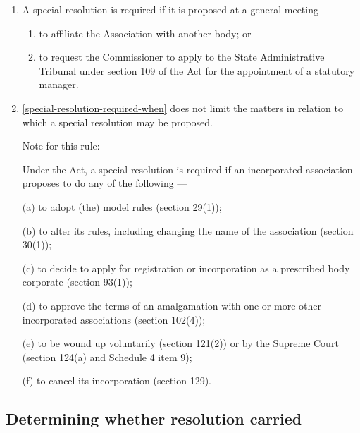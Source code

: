 \documentclass[../constitution.tex]{subfiles}
\begin{document}
\begin{enumerate}

\item A special resolution is required if it is proposed at a general meeting --- \label{special-resolution-required-when}

  \begin{enumerate}
  
  \item to affiliate the Association with another body; or
  \item to request the Commissioner to apply to the State Administrative Tribunal under section 109 of the Act for the appointment of a statutory manager.
  \end{enumerate}
\item {} \ref{special-resolution-required-when} does not limit the matters in relation to which a special resolution may be proposed.


Note for this rule: 

Under the Act, a special resolution is required if an incorporated association proposes to do any of the following — 

(a) to adopt (the) model rules (section 29(1)); 

(b) to alter its rules, including changing the name of the association (section 30(1)); 

(c) to decide to apply for registration or incorporation as a prescribed body corporate (section 93(1)); 

(d) to approve the terms of an amalgamation with one or more other incorporated associations (section 102(4)); 

(e) to be wound up voluntarily (section 121(2)) or by the Supreme Court (section 124(a) and Schedule 4 item 9); 

(f) to cancel its incorporation (section 129). 


\end{enumerate}

\hypertarget{determining-whether-resolution-carried}{%
\subsection{Determining whether resolution carried}\label{determining-whether-resolution-carried}}
\end{document}
